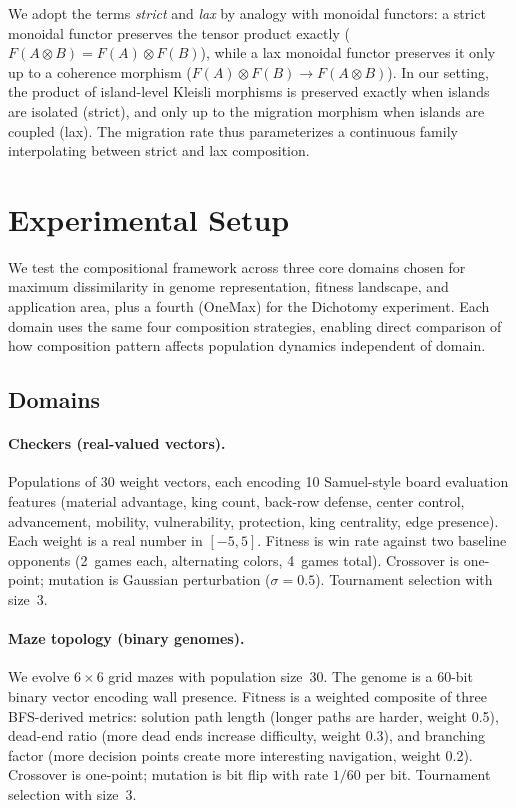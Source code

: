 \documentclass[sigconf,anonymous]{acmart}
\begin{document}
We adopt the terms \emph{strict} and \emph{lax} by analogy with monoidal functors: a strict monoidal functor preserves the tensor product exactly ($F(A \otimes B) = F(A) \otimes F(B)$), while a lax monoidal functor preserves it only up to a coherence morphism ($F(A) \otimes F(B) \to F(A \otimes B)$). In our setting, the product of island-level Kleisli morphisms is preserved exactly when islands are isolated (strict), and only up to the migration morphism when islands are coupled (lax). The migration rate thus parameterizes a continuous family interpolating between strict and lax composition.

\section{Experimental Setup}

We test the compositional framework across three core domains chosen for maximum dissimilarity in genome representation, fitness landscape, and application area, plus a fourth (OneMax) for the Dichotomy experiment. Each domain uses the same four composition strategies, enabling direct comparison of how composition pattern affects population dynamics independent of domain.

\subsection{Domains}

\paragraph{Checkers (real-valued vectors).}
Populations of 30 weight vectors, each encoding 10 Samuel-style board evaluation features (material advantage, king count, back-row defense, center control, advancement, mobility, vulnerability, protection, king centrality, edge presence).
Each weight is a real number in $[-5, 5]$. Fitness is win rate against two baseline opponents (2~games each, alternating colors, 4~games total). Crossover is one-point; mutation is Gaussian perturbation ($\sigma = 0.5$). Tournament selection with size~3.

\paragraph{Maze topology (binary genomes).}
We evolve $6 \times 6$ grid mazes with population size~30. The genome is a 60-bit binary vector encoding wall presence. Fitness is a weighted composite of three BFS-derived metrics: solution path length (longer paths are harder, weight 0.5), dead-end ratio (more dead ends increase difficulty, weight 0.3), and branching factor (more decision points create more interesting navigation, weight 0.2). Crossover is one-point; mutation is bit flip with rate $1/60$ per bit. Tournament selection with size~3.
\end{document}
